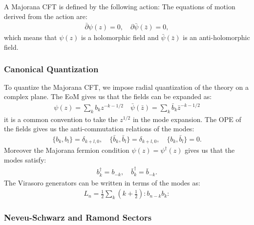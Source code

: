 A Majorana CFT is defined by the following action:
The equations of motion derived from the action are:
\begin{align}
  \bar{\partial} \psi(z) = 0, \quad \partial \bar{\psi}(\bar{z}) = 0,
\end{align}
which means that $\psi(z)$ is a holomorphic field and $\bar{\psi}(\bar{z})$ is an anti-holomorphic field. 

\subsubsection{Canonical Quantization}

To quantize the Majorana CFT, we impose radial quantization of the theory on a complex plane. The EoM gives us that the fields can be expanded as:
\begin{align}
  \psi(z)=\sum_kb_kz^{-k-1/2} \quad \bar{\psi}(\bar{z})=\sum_k\bar{b}_k\bar{z}^{-k-1/2}
\end{align}
it is a common convention to take the $ z^{1/2} $ in the mode expansion. The OPE of the fields gives us the anti-commutation relations of the modes:
\begin{align}
  \{ b_k, b_l \} = \delta_{k+l,0}, \quad \{ \bar{b}_k, \bar{b}_l \} = \delta_{k+l,0}, \quad \{ b_k, \bar{b}_l \} = 0.
\end{align}
Moreover the Majorana fermion condition $ \psi(z) = \psi^\dagger(z) $ gives us that the modes satisfy:
\begin{align}
  b_k^\dagger = b_{-k}, \quad \bar{b}_k^\dagger = \bar{b}_{-k}.
\end{align}
The Virasoro generators can be written in terms of the modes as:
\begin{align}
  L_n=\frac{1}{2}\sum_k(k+\frac{1}{2}):b_{n-k}b_k:
\end{align}

\subsubsection{Neveu-Schwarz and Ramond Sectors}

